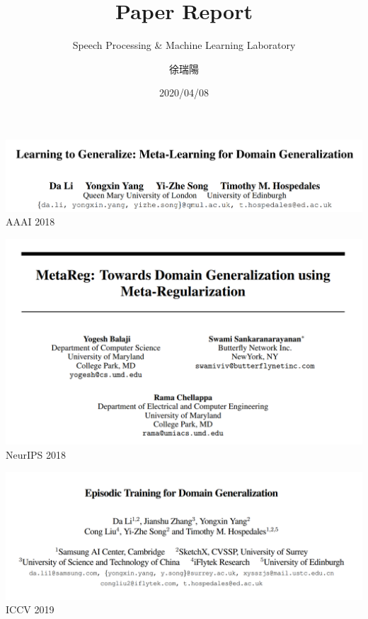 \documentclass{beamer}
\title{Paper Report}
\subtitle{\textcolor[rgb]{0.00,0.50,1.00}{{Speech Processing \& Machine Learning Laboratory}}}
\author{徐瑞陽}
\date{2020/04/08}
\begin{document}
\begin{frame}
\maketitle
\end{frame}





\begin{frame}
  \includegraphics[width=\textwidth]{fig/MLDG-title.png}
  \center AAAI 2018
\end{frame}

\begin{frame}
  \includegraphics[width=\textwidth]{fig/MetaReg.png}
  \center NeurIPS 2018
\end{frame}

\begin{frame}
  \includegraphics[width=\textwidth]{fig/EpiFCR-title.png}
  \center ICCV 2019
\end{frame}
\end{document}
